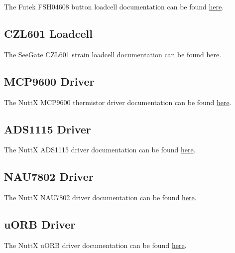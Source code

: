 The Futek FSH04608 button loadcell documentation can be found
\href{https://www.futek.com/store/load-cells/load-button/load-button-threaded-tapped-holes-LLB400/FSH04608}{here}.

\subsection{CZL601 Loadcell} \label{apx:loadcell-strain}

The SeeGate CZL601 strain loadcell documentation can be found
\href{https://seegateloadcell.com/product/czl-601-single-point-loadcell/ko}{here}.

\subsection{MCP9600 Driver} \label{apx:mcp9600}

The NuttX MCP9600 thermistor driver documentation can be found
\href{https://nuttx.apache.org/docs/latest/components/drivers/special/sensors/mcp9600.html}{here}.

\subsection{ADS1115 Driver} \label{apx:ads1115}

The NuttX ADS1115 driver documentation can be found
\href{https://nuttx.apache.org/docs/latest/components/drivers/character/analog/adc/ads1115/index.html}{here}.

\subsection{NAU7802 Driver} \label{apx:nau7802}

The NuttX NAU7802 driver documentation can be found
\href{https://nuttx.apache.org/docs/latest/components/drivers/special/sensors/nau7802.html}{here}.

\subsection{uORB Driver} \label{apx:uorb}

The NuttX uORB driver documentation can be found
\href{https://nuttx.apache.org/docs/latest/components/drivers/special/sensors/sensors_uorb.html}{here}.